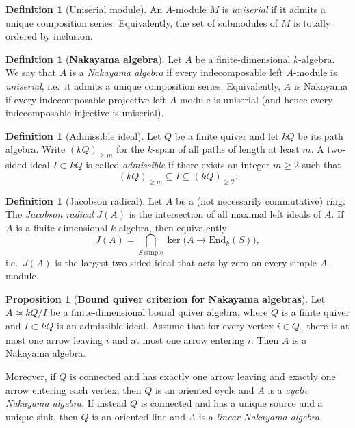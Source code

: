 \documentclass{article}
\theoremstyle{definition}
\newtheorem{proposition}[theorem]{Proposition}
\newtheorem{definition}[theorem]{Definition}
\begin{document}
\begin{definition}[Uniserial module]
An $A$-module $M$ is \emph{uniserial} if it admits a unique composition series. Equivalently, the set of submodules of $M$ is totally ordered by inclusion.
\end{definition}
\begin{definition}[\textbf{Nakayama algebra}]
Let $A$ be a finite-dimensional $k$-algebra. We say that $A$ is a \emph{Nakayama algebra} if every indecomposable left $A$-module is \emph{uniserial}, i.e.\ it admits a unique composition series.
Equivalently, $A$ is Nakayama if every indecomposable projective left $A$-module is uniserial (and hence every indecomposable injective is uniserial).
\end{definition}

\begin{definition}[Admissible ideal]
Let $Q$ be a finite quiver and let $kQ$ be its path algebra. Write $(kQ)_{\ge m}$ for the $k$-span of all paths of length at least $m$.
A two-sided ideal $I\subset kQ$ is called \emph{admissible} if there exists an integer $m\ge 2$ such that
\[
(kQ)_{\ge m}\subseteq I \subseteq (kQ)_{\ge 2}.
\]
\end{definition}

\begin{definition}[Jacobson radical]
Let $A$ be a (not necessarily commutative) ring. The \emph{Jacobson radical} $J(A)$ is the intersection of all maximal left ideals of $A$.
If $A$ is a finite-dimensional $k$-algebra, then equivalently
\[
J(A)=\bigcap_{S\ \text{simple}} \ker\big(A\to \mathrm{End}_k(S)\big),
\]
i.e.\ $J(A)$ is the largest two-sided ideal that acts by zero on every simple $A$-module.
\end{definition}

\begin{proposition}[\textbf{Bound quiver criterion for Nakayama algebras}]\label{prop:bound-quiver-nakayama}
Let $A \simeq kQ/I$ be a finite-dimensional bound quiver algebra, where $Q$ is a finite quiver and
$I\subset kQ$ is an admissible ideal.
Assume that for every vertex $i\in Q_0$ there is at most one arrow leaving $i$ and at most one arrow entering $i$.
Then $A$ is a Nakayama algebra.

Moreover, if $Q$ is connected and has exactly one arrow leaving and exactly one arrow entering each vertex, then $Q$ is an oriented cycle and $A$ is a \emph{cyclic Nakayama algebra}. If instead $Q$ is connected and has a unique source and a unique sink, then $Q$ is an oriented line and $A$ is a \emph{linear Nakayama algebra}.
\end{proposition}
\end{document}
